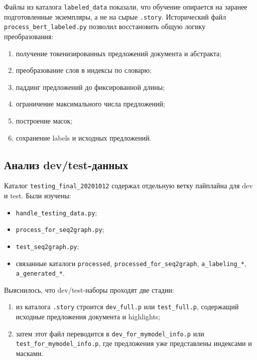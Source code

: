 \documentclass[12pt,a4paper]{article}
\begin{document}
Файлы из каталога \texttt{labeled\_data} показали, что обучение опирается на заранее
подготовленные экземпляры, а не на сырые \texttt{.story}. Исторический файл
\texttt{process\_bert\_labeled.py} позволил восстановить общую логику преобразования:

\begin{enumerate}
    \item получение токенизированных предложений документа и абстракта;
    \item преобразование слов в индексы по словарю;
    \item паддинг предложений до фиксированной длины;
    \item ограничение максимального числа предложений;
    \item построение масок;
    \item сохранение labels и исходных предложений.
\end{enumerate}

\subsection{Анализ dev/test-данных}

Каталог \texttt{testing\_final\_20201012} содержал отдельную ветку пайплайна для dev и
test. Были изучены:

\begin{itemize}
    \item \texttt{handle\_testing\_data.py};
    \item \texttt{process\_for\_seq2graph.py};
    \item \texttt{test\_seq2graph.py};
    \item связанные каталоги \texttt{processed}, \texttt{processed\_for\_seq2graph},
    \texttt{a\_labeling\_*}, \texttt{a\_generated\_*}.
\end{itemize}

Выяснилось, что dev/test-наборы проходят две стадии:

\begin{enumerate}
    \item из каталога \texttt{.story} строится \texttt{dev\_full.p} или
    \texttt{test\_full.p}, содержащий исходные предложения документа и highlights;
    \item затем этот файл переводится в \texttt{dev\_for\_mymodel\_info.p} или \\
    \texttt{test\_for\_mymodel\_info.p}, где предложения уже представлены индексами и
    масками.
\end{enumerate}
\end{document}
